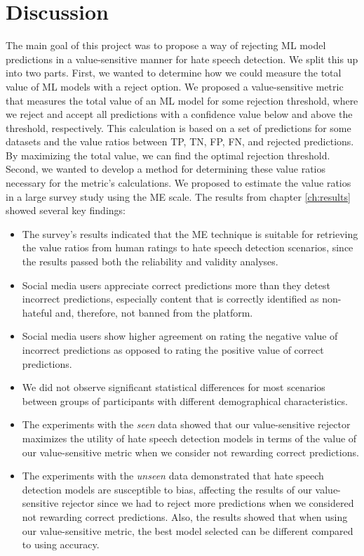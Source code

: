 \chapter{Discussion}
\label{ch:discussion}
The main goal of this project was to propose a way of rejecting ML model predictions in a value-sensitive manner for hate speech detection.
%
We split this up into two parts.
%
First, we wanted to determine how we could measure the total value of ML models with a reject option.
%
We proposed a value-sensitive metric that measures the total value of an ML model for some rejection threshold, where we reject and accept all predictions with a confidence value below and above the threshold, respectively.
%
This calculation is based on a set of predictions for some datasets and the value ratios between TP, TN, FP, FN, and rejected predictions.
%
By maximizing the total value, we can find the optimal rejection threshold.
%
Second, we wanted to develop a method for determining these value ratios necessary for the metric's calculations.
%
We proposed to estimate the value ratios in a large survey study using the ME scale.
%
The results from chapter \ref{ch:results} showed several key findings:
\begin{itemize}
    \item The survey's results indicated that the ME technique is suitable for retrieving the value ratios from human ratings to hate speech detection scenarios, since the results passed both the reliability and validity analyses.
    \item Social media users appreciate correct predictions more than they detest incorrect predictions, especially content that is correctly identified as non-hateful and, therefore, not banned from the platform.
    \item Social media users show higher agreement on rating the negative value of incorrect predictions as opposed to rating the positive value of correct predictions.
    \item We did not observe significant statistical differences for most scenarios between groups of participants with different demographical characteristics.
    \item The experiments with the \emph{seen} data showed that our value-sensitive rejector maximizes the utility of hate speech detection models in terms of the value of our value-sensitive metric when we consider not rewarding correct predictions.
    \item The experiments with the \emph{unseen} data demonstrated that hate speech detection models are susceptible to bias, affecting the results of our value-sensitive rejector since we had to reject more predictions when we considered not rewarding correct predictions. Also, the results showed that when using our value-sensitive metric, the best model selected can be different compared to using accuracy.
\end{itemize}
%

